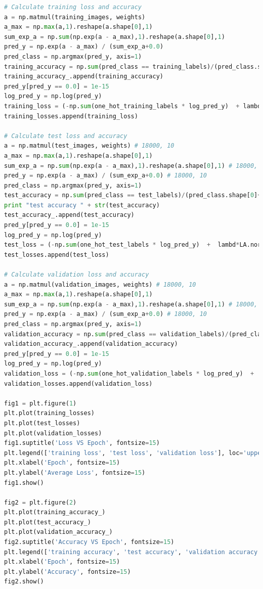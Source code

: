 \documentclass{article} %
\begin{document}
{\begin{lstlisting}[language=Python]
# Calculate training loss and accuracy
a = np.matmul(training_images, weights) 
a_max = np.max(a,1).reshape(a.shape[0],1)
sum_exp_a = np.sum(np.exp(a - a_max),1).reshape(a.shape[0],1) 
pred_y = np.exp(a - a_max) / (sum_exp_a+0.0) 
pred_class = np.argmax(pred_y, axis=1)
training_accuracy = np.sum(pred_class == training_labels)/(pred_class.shape[0]+0.0)
training_accuracy_.append(training_accuracy)
pred_y[pred_y == 0.0] = 1e-15
log_pred_y = np.log(pred_y)
training_loss = (-np.sum(one_hot_training_labels * log_pred_y)  + lambd*LA.norm(weights)**2) / training_images.shape[0]
training_losses.append(training_loss)

# Calculate test loss and accuracy
a = np.matmul(test_images, weights) # 18000, 10
a_max = np.max(a,1).reshape(a.shape[0],1)
sum_exp_a = np.sum(np.exp(a - a_max),1).reshape(a.shape[0],1) # 18000, 1
pred_y = np.exp(a - a_max) / (sum_exp_a+0.0) # 18000, 10
pred_class = np.argmax(pred_y, axis=1)
test_accuracy = np.sum(pred_class == test_labels)/(pred_class.shape[0]+0.0)
print "test accuracy " + str(test_accuracy)
test_accuracy_.append(test_accuracy)
pred_y[pred_y == 0.0] = 1e-15
log_pred_y = np.log(pred_y)
test_loss = (-np.sum(one_hot_test_labels * log_pred_y)  +  lambd*LA.norm(weights)**2) / test_images.shape[0]
test_losses.append(test_loss)

# Calculate validation loss and accuracy
a = np.matmul(validation_images, weights) # 18000, 10
a_max = np.max(a,1).reshape(a.shape[0],1)
sum_exp_a = np.sum(np.exp(a - a_max),1).reshape(a.shape[0],1) # 18000, 1
pred_y = np.exp(a - a_max) / (sum_exp_a+0.0) # 18000, 10
pred_class = np.argmax(pred_y, axis=1)
validation_accuracy = np.sum(pred_class == validation_labels)/(pred_class.shape[0]+0.0) 
validation_accuracy_.append(validation_accuracy)
pred_y[pred_y == 0.0] = 1e-15
log_pred_y = np.log(pred_y)
validation_loss = (-np.sum(one_hot_validation_labels * log_pred_y)  +  lambd*LA.norm(weights)**2) / validation_images.shape[0]
validation_losses.append(validation_loss) 

fig1 = plt.figure(1)
plt.plot(training_losses)
plt.plot(test_losses)
plt.plot(validation_losses)
fig1.suptitle('Loss VS Epoch', fontsize=15)
plt.legend(['training loss', 'test loss', 'validation loss'], loc='upper right')
plt.xlabel('Epoch', fontsize=15)
plt.ylabel('Average Loss', fontsize=15)
fig1.show()

fig2 = plt.figure(2)
plt.plot(training_accuracy_)
plt.plot(test_accuracy_)
plt.plot(validation_accuracy_)
fig2.suptitle('Accuracy VS Epoch', fontsize=15)
plt.legend(['training accuracy', 'test accuracy', 'validation accuracy'], loc='lower right')
plt.xlabel('Epoch', fontsize=15)
plt.ylabel('Accuracy', fontsize=15)
fig2.show()


\end{lstlisting}}
\end{document}
